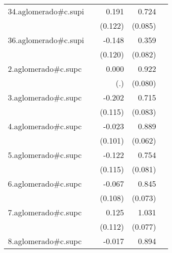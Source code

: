 {\begin{longtable}{l*{4}{D{.}{.}{-1}}}
\addlinespace
34.aglomerado#c.supi&                     &       0.191         &       0.724\sym{***}&                     \\
            &                     &     (0.122)         &     (0.085)         &                     \\
\addlinespace
36.aglomerado#c.supi&                     &      -0.148         &       0.359\sym{***}&                     \\
            &                     &     (0.120)         &     (0.082)         &                     \\
\addlinespace
2.aglomerado#c.supc&                     &       0.000         &       0.922\sym{***}&                     \\
            &                     &         (.)         &     (0.080)         &                     \\
\addlinespace
3.aglomerado#c.supc&                     &      -0.202         &       0.715\sym{***}&                     \\
            &                     &     (0.115)         &     (0.083)         &                     \\
\addlinespace
4.aglomerado#c.supc&                     &      -0.023         &       0.889\sym{***}&                     \\
            &                     &     (0.101)         &     (0.062)         &                     \\
\addlinespace
5.aglomerado#c.supc&                     &      -0.122         &       0.754\sym{***}&                     \\
            &                     &     (0.115)         &     (0.081)         &                     \\
\addlinespace
6.aglomerado#c.supc&                     &      -0.067         &       0.845\sym{***}&                     \\
            &                     &     (0.108)         &     (0.073)         &                     \\
\addlinespace
7.aglomerado#c.supc&                     &       0.125         &       1.031\sym{***}&                     \\
            &                     &     (0.112)         &     (0.077)         &                     \\
\addlinespace
8.aglomerado#c.supc&                     &      -0.017         &       0.894\sym{***}&                     \\

\end{longtable}}
